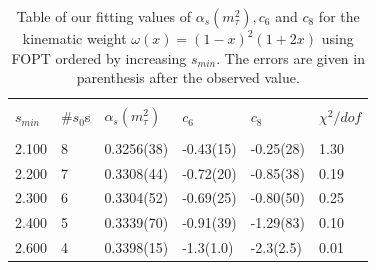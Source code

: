 \documentclass[../../index.tex]{subfiles}
\begin{document}
\begin{table}
  \centering
  \begin{tabular}{llllll}
    \toprule \\
    \(s_{min}\) & \#\(s_0\)s & \(\alpha_s(m_\tau^2)\) & \(c_6\) & \(c_8\) & \(\chi^2/dof\)  \\
    \hline \\
    2.100 & 8 & 0.3256(38) & -0.43(15) & -0.25(28) & 1.30 \\
    \rowcolor{primary}
    2.200 & 7 & 0.3308(44) & -0.72(20) & -0.85(38) & 0.19 \\
    \rowcolor{primary}
    2.300 & 6 & 0.3304(52) & -0.69(25) & -0.80(50) & 0.25 \\
    \rowcolor{primary}
    2.400 & 5 & 0.3339(70) & -0.91(39) & -1.29(83) & 0.10 \\
    2.600 & 4 & 0.3398(15) & -1.3(1.0) & -2.3(2.5) & 0.01  \\
    \bottomrule
  \end{tabular}
  \caption{Table of our fitting values of \(\alpha_s(m_\tau^2), c_6\) and
    \(c_8\) for the kinematic weight \(\omega(x)=(1-x)^2(1+2x)\) using FOPT
    ordered by increasing \(s_{min}\). The errors are given in parenthesis after
    the observed value.}
  \label{table:fitWKinAlD6D8}
\end{table}
\end{document}
